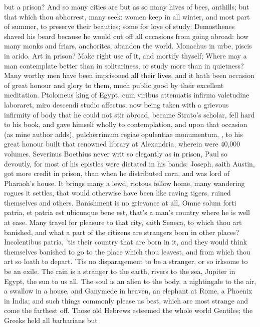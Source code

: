 {but a prison? And so many cities are but as so many hives of bees,
anthills; but that which thou abhorrest, many seek: women keep in all
winter, and most part of summer, to preserve their beauties; some for
love of study: Demosthenes shaved his beard because he would cut off
all occasions from going abroad: how many monks and friars, anchorites,
abandon the world. Monachus in urbe, piscis in arido. Art in prison?
Make right use of it, and mortify thyself;  Where may a man
contemplate better than in solitariness, or study more than in
quietness? Many worthy men have been imprisoned all their lives, and it
hath been occasion of great honour and glory to them, much public good
by their excellent meditation. Ptolomeus king of Egypt, cum
viribus attenuatis infirma valetudine laboraret, miro descendi studio
affectus, \etc{} now being taken with a grievous infirmity of body that he
could not stir abroad, became Strato's scholar, fell hard to his book,
and gave himself wholly to contemplation, and upon that occasion (as
mine author adds), pulcherrimum regiae opulentiae monumentum, \etc{}, to
his great honour built that renowned library at Alexandria, wherein
were 40,000 volumes. Severinus Boethius never writ so elegantly as in
prison, Paul so devoutly, for most of his epistles were dictated in his
bands: Joseph, saith Austin, got more credit in prison, than when
he distributed corn, and was lord of Pharaoh's house. It brings many a
lewd, riotous fellow home, many wandering rogues it settles, that would
otherwise have been like raving tigers, ruined themselves and others.
Banishment is no grievance at all, Omne solum forti patria, \etc{} et
patria est ubicunque bene est, that's a man's country where he is well
at ease. Many travel for pleasure to that city, saith Seneca, to which
thou art banished, and what a part of the citizens are strangers born
in other places? Incolentibus patria, 'tis their country that are
born in it, and they would think themselves banished to go to the place
which thou leavest, and from which thou art so loath to depart. 'Tis no
disparagement to be a stranger, or so irksome to be an exile. The
rain is a stranger to the earth, rivers to the sea, Jupiter in Egypt,
the sun to us all. The soul is an alien to the body, a nightingale to
the air, a swallow in a house, and Ganymede in heaven, an elephant at
Rome, a Phoenix in India; and such things commonly please us best,
which are most strange and come the farthest off. Those old Hebrews
esteemed the whole world Gentiles; the Greeks held all barbarians but
}
